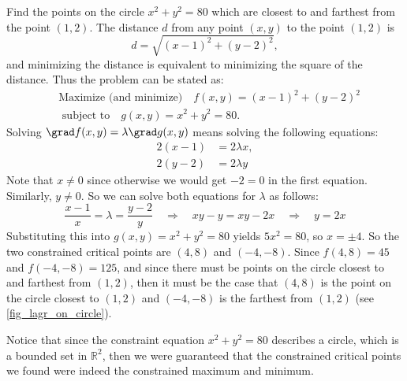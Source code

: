 \begin{example}\label{ex_lagr_circle}
Find the points on the circle $x^2 + y^2 = 80$ which are closest to and farthest from the point $(1,2)$.
\solution
The distance $d$ from any point $(x,y)$ to the point $(1,2)$ is
  \[d=\sqrt{(x-1)^2 + (y-2)^2},\]
 and minimizing the distance is equivalent to minimizing the square of the distance. Thus the problem can be stated as:
 \begin{align*}
 &\text{Maximize (and minimize)}\quad f(x,y) = (x-1)^2 + (y-2)^2\\
 &\text{ subject to}\quad g(x,y) = x^2 + y^2 = 80.
 \end{align*}
 Solving $\grad f(x,y) = \lambda \grad g(x,y)$ means solving the following equations:
 \begin{align*}
  2(x-1) &= 2\lambda x ,\\
  2(y-2) &= 2\lambda y
 \end{align*}
 Note that $x \ne 0$ since otherwise we would get $-2=0$ in the first equation. Similarly, $y \ne 0$. So we can solve both equations for $\lambda$ as follows:
 \[
  \frac{x-1}x=\lambda=\frac{y-2}y\quad\Rightarrow\quad
  xy-y=xy-2x\quad\Rightarrow\quad
  y=2x
 \]
%
 Substituting this into $g(x,y) = x^2 + y^2 = 80$ yields $5x^2=80$, so $x=\pm 4$. So the two constrained critical points are $(4,8)$ and $(-4,-8)$. Since $f(4,8)=45$ and $f(-4,-8)=125$, and since there must be points on the circle closest to and farthest from $(1,2)$, then it must be the case that $(4,8)$ is the point on the circle closest to $(1,2)$ and $(-4,-8)$ is the farthest from $(1,2)$ (see \autoref{fig_lagr_on_circle}).
 
 Notice that since the constraint equation $x^2 + y^2 = 80$ describes a circle, which is a bounded set in $\mathbb{R}^2$, then we were guaranteed that the constrained critical points we found were indeed the constrained maximum and  minimum.
\end{example}

